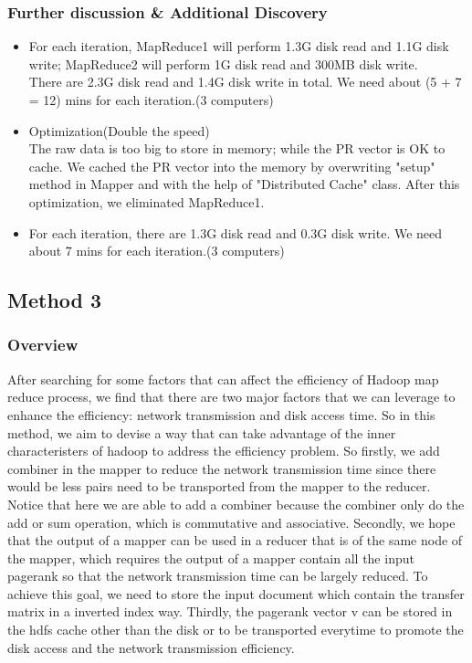 \documentclass[a4paper]{article}
\begin{document}
\subsubsection{Further discussion \& Additional Discovery}
\begin{itemize}
	\item For each iteration, MapReduce1 will perform 1.3G disk read and 1.1G disk write; MapReduce2 will perform 1G disk read and 300MB disk write.\\
	There are 2.3G disk read and 1.4G disk write in total.
We need about (5 + 7 = 12) mins for each iteration.(3 computers)
	\item Optimization(Double the speed)\\
	The raw data is too big to store in memory; while the PR vector is OK to cache. We cached the PR vector into the memory by overwriting "setup" method in Mapper and with the help of "Distributed Cache" class.
After this optimization, we eliminated MapReduce1.
	\item For each iteration, there are 1.3G disk read and 0.3G disk write. We need about 7 mins for each iteration.(3 computers)
\end{itemize}


\subsection{Method 3}
\subsubsection{Overview}
After searching for some factors that can affect the efficiency of Hadoop map reduce process, we find that there are two major factors that we can leverage to enhance the efficiency: network transmission and disk access time. So in this method, we aim to devise a way that can take advantage of the inner characteristers of hadoop to address the efficiency problem. So firstly, we add combiner in the mapper to reduce the network transmission time since there would be less pairs need to be transported from the mapper to the reducer. Notice that here we are able to add a combiner because the combiner only do the add or sum operation, which is commutative and associative. Secondly, we hope that the output of a mapper can be used in a reducer that is of the same node of the mapper, which requires the output of a mapper contain all the input pagerank so that the network transmission time can be largely reduced. To achieve this goal, we need to store the input document which contain the transfer matrix in a inverted index way. Thirdly, the pagerank vector v can be stored in the hdfs cache other than the disk or to be transported everytime to promote the disk access and the network transmission efficiency.\\ 
\end{document}
